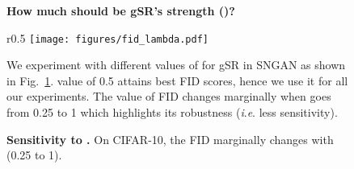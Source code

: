 \documentclass[runningheads,table]{llncs}
\newcommand{\ie}{\textit{i}.\textit{e}. }
\begin{document}
\begin{figure*}[!ht]
\begin{subfigure}[b]{\textwidth}
\vspace{1mm}\noindent\textbf{How much should be gSR's strength ()? }
\setlength{\intextsep}{0pt}\begin{wrapfigure}{r}{0.5\textwidth}
    \texttt{[image: figures/fid\_lambda.pdf]}
    \caption{\textbf{Sensitivity to .}  On CIFAR-10, the FID marginally changes with  (0.25 to 1).}
    \label{fig:supp:fid_lambda}
\vspace{-8mm}
\end{wrapfigure} 

\noindent \vspace{1mm} We experiment with different values of  for gSR in SNGAN as shown in Fig.~\ref{fig:supp:fid_lambda}.  value of 0.5 attains best FID scores, hence we use it for all our experiments. 
 The value of FID changes marginally when  goes from 0.25 to 1 which highlights its robustness (\ie less sensitivity). 



\end{subfigure}
\end{figure*}
\end{document}
